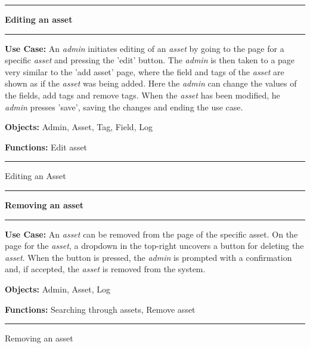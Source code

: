\begin{use_case}[H]
    \hrule
    \vskip 0.3cm
    \Large
    \begin{center}
    
        \textbf{Editing an asset}
        
    \end{center}
    \vskip 0.1cm
    \hrule
    \vskip 0.2cm
    \normalsize
    
    \textbf{Use Case:} An \textit{admin} initiates editing of an \textit{asset} by going to the page for a specific \textit{asset} and pressing the 'edit' button. The \textit{admin} is then taken to a page very similar to the 'add asset' page, where the field and tags of the \textit{asset} are shown as if the \textit{asset} was being added. Here the \textit{admin} can change the values of the fields, add tags and remove tags. When the \textit{asset} has been modified, he \textit{admin} presses 'save', saving the changes and ending the use case.
    
    \vskip 0.2cm
    
    \textbf{Objects:} Admin, Asset, Tag, Field, Log
    
    \vskip 0.2cm
    
    \textbf{Functions:} Edit asset
    
    \vskip 0.4cm
    \hrule
    \vskip 0.2cm
    \caption{Editing an Asset} \label{use_case:edit_asset}
\end{use_case}


\begin{use_case}[H]
    \hrule
    \vskip 0.3cm
    \Large
    \begin{center}
    
        \textbf{Removing an asset}
        
    \end{center}
    \vskip 0.1cm
    \hrule
    \vskip 0.2cm
    \normalsize
    
    \textbf{Use Case:} An \textit{asset} can be removed from the page of the specific asset. On the page for the \textit{asset}, a dropdown in the top-right uncovers a button for deleting the \textit{asset}. When the button is pressed, the \textit{admin} is prompted with a confirmation and, if accepted, the \textit{asset} is removed from the system.
    
    \vskip 0.2cm
    
    \textbf{Objects:} Admin, Asset, Log
    
    \vskip 0.2cm
    
    \textbf{Functions:} Searching through assets, Remove asset
    
    \vskip 0.4cm
    \hrule
    \vskip 0.2cm
    \caption{Removing an asset} \label{use_case:removing_an_asset}
\end{use_case}

